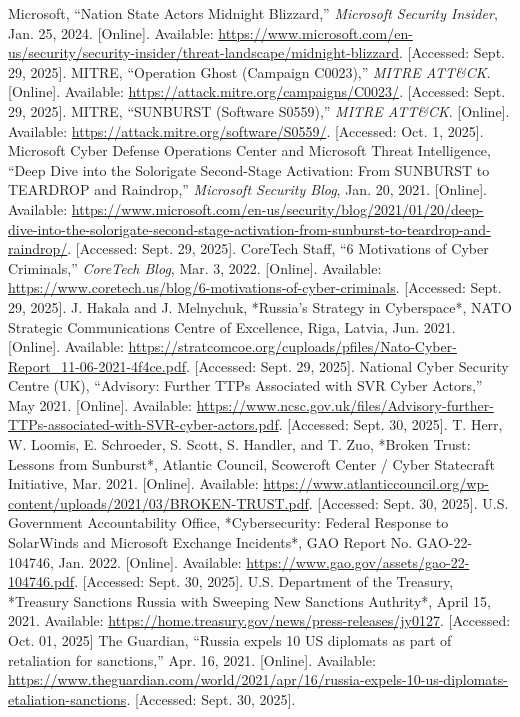 \documentclass[conference]{IEEEtran}
\begin{document}
\begin{thebibliography}{}
 Microsoft, ``Nation State Actors Midnight Blizzard,'' \emph{Microsoft Security Insider}, Jan. 25, 2024. [Online]. Available: \url{https://www.microsoft.com/en-us/security/security-insider/threat-landscape/midnight-blizzard}. [Accessed: Sept. 29, 2025].
 MITRE, ``Operation Ghost (Campaign C0023),'' \emph{MITRE ATT\&CK}. [Online]. Available: \url{https://attack.mitre.org/campaigns/C0023/}. [Accessed: Sept. 29, 2025].
 MITRE, ``SUNBURST (Software S0559),'' \emph{MITRE ATT\&CK}. [Online]. Available: \url{https://attack.mitre.org/software/S0559/}. [Accessed: Oct. 1, 2025].
 Microsoft Cyber Defense Operations Center and Microsoft Threat Intelligence, ``Deep Dive into the Solorigate Second-Stage Activation: From SUNBURST to TEARDROP and Raindrop,'' \emph{Microsoft Security Blog}, Jan. 20, 2021. [Online]. Available: \url{https://www.microsoft.com/en-us/security/blog/2021/01/20/deep-dive-into-the-solorigate-second-stage-activation-from-sunburst-to-teardrop-and-raindrop/}. [Accessed: Sept. 29, 2025].
 CoreTech Staff, ``6 Motivations of Cyber Criminals,'' \emph{CoreTech Blog}, Mar. 3, 2022. [Online]. Available: \url{https://www.coretech.us/blog/6-motivations-of-cyber-criminals}. [Accessed: Sept. 29, 2025].
 J. Hakala and J. Melnychuk, *Russia’s Strategy in Cyberspace*, NATO Strategic Communications Centre of Excellence, Riga, Latvia, Jun. 2021. [Online]. Available: \url{https://stratcomcoe.org/cuploads/pfiles/Nato-Cyber-Report_11-06-2021-4f4ce.pdf}. [Accessed: Sept. 29, 2025].
 National Cyber Security Centre (UK), ``Advisory: Further TTPs Associated with SVR Cyber Actors,'' May 2021. [Online]. Available: \url{https://www.ncsc.gov.uk/files/Advisory-further-TTPs-associated-with-SVR-cyber-actors.pdf}. [Accessed: Sept. 30, 2025].
 T. Herr, W. Loomis, E. Schroeder, S. Scott, S. Handler, and T. Zuo, *Broken Trust: Lessons from Sunburst*, Atlantic Council, Scowcroft Center / Cyber Statecraft Initiative, Mar. 2021. [Online]. Available: \url{https://www.atlanticcouncil.org/wp-content/uploads/2021/03/BROKEN-TRUST.pdf}. [Accessed: Sept. 30, 2025].
 U.S. Government Accountability Office, *Cybersecurity: Federal Response to SolarWinds and Microsoft Exchange Incidents*, GAO Report No. GAO-22-104746, Jan. 2022. [Online]. Available: \url{https://www.gao.gov/assets/gao-22-104746.pdf}. [Accessed: Sept. 30, 2025].
 U.S. Department of the Treasury, *Treasury Sanctions Russia with Sweeping New Sanctions Authrity*, April 15, 2021. Available: \url{https://home.treasury.gov/news/press-releases/jy0127}. [Accessed: Oct. 01, 2025]
 The Guardian, ``Russia expels 10 US diplomats as part of retaliation for sanctions,'' Apr. 16, 2021. [Online]. Available: \url{https://www.theguardian.com/world/2021/apr/16/russia-expels-10-us-diplomats-etaliation-sanctions}. [Accessed: Sept. 30, 2025].
\end{thebibliography}
\vspace{12pt}
\end{document}
